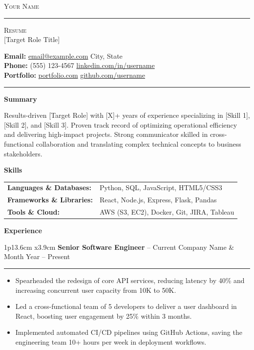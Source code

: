\documentclass[10pt,a4paper]{article}
\newcommand{\cvsection}[1]{
    \vspace{8pt}
    \begin{center}
        \large\textcolor{sectcol}{\textbf{#1}}
    \end{center}
    \vspace{-4pt}
}
\newcommand{\metasection}[2]{
    \footnotesize{#2} \hspace*{\fill} \footnotesize{#1}\\[2pt]
}
\newcommand{\cvevent}[3]{
    \begin{tabular*}{1\textwidth}{p{13.6cm} x{3.9cm}}
        \textbf{#2} -- \textcolor{bgcol}{#3} & \vspace{2.5pt}\textcolor{sectcol}{#1}
    \end{tabular*}
    \vspace{-8pt}
    \textcolor{softcol}{\hrule}
    \vspace{4pt}
}
\begin{document}
\color{textColor}

\vspace{-8pt}
\begin{center}
    {\Huge \textsc{Your Name}} \textcolor{sectcol}{\rule[-1mm]{1mm}{0.9cm}} \textsc{Resume}\\[4pt]
    \small [Target Role Title]
\end{center}
\vspace{6pt}

\metasection{City, State}{\textbf{Email:} \href{mailto:email@example.com}{email@example.com}}
\metasection{\href{https://linkedin.com/in/username}{linkedin.com/in/username}}{\textbf{Phone:} (555) 123-4567} 
\metasection{\href{https://github.com/username}{github.com/username}}{\textbf{Portfolio:} \href{https://portfolio.com}{portfolio.com}}
\vspace{-2pt}
\textcolor{softcol}{\hrule}
\vspace{6pt}

\cvsection{Summary}
Results-driven [Target Role] with [X]+ years of experience specializing in [Skill 1], [Skill 2], and [Skill 3]. Proven track record of optimizing operational efficiency and delivering high-impact projects. Strong communicator skilled in cross-functional collaboration and translating complex technical concepts to business stakeholders.
\vspace{4pt}

\cvsection{Skills}
\begin{tabular}{ @{} p{1.8in} @{} p{5.2in} }
    \textbf{Languages \& Databases:} & Python, SQL, JavaScript, HTML5/CSS3 \\
    \textbf{Frameworks \& Libraries:} & React, Node.js, Express, Flask, Pandas \\
    \textbf{Tools \& Cloud:} & AWS (S3, EC2), Docker, Git, JIRA, Tableau \\
\end{tabular}
\vspace{4pt}

\cvsection{Experience}

\cvevent{Month Year -- Present}{Senior Software Engineer}{Current Company Name}
\begin{itemize}
    \item Spearheaded the redesign of core API services, reducing latency by 40\% and increasing concurrent user capacity from 10K to 50K.
    \item Led a cross-functional team of 5 developers to deliver a user dashboard in React, boosting user engagement by 25\% within 3 months.
    \item Implemented automated CI/CD pipelines using GitHub Actions, saving the engineering team 10+ hours per week in deployment workflows.
\end{itemize}
\vspace{6pt}
\end{document}
